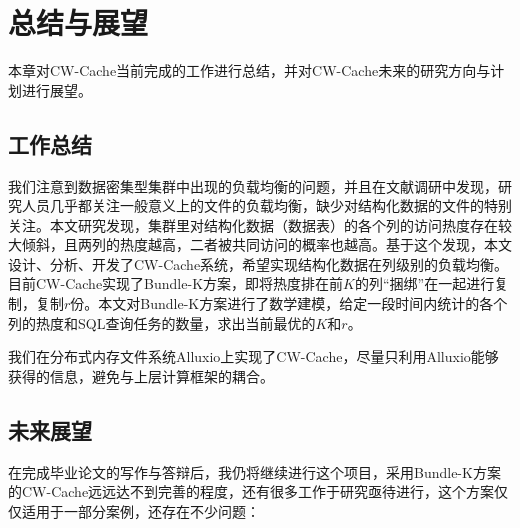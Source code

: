 \chapter{总结与展望}
\label{chp:future}

\par 本章对CW-Cache当前完成的工作进行总结，并对CW-Cache未来的研究方向与计划进行展望。

\section{工作总结}

\par 我们注意到数据密集型集群中出现的负载均衡的问题，并且在文献调研中发现，研究人员几乎都关注一般意义上的文件的负载均衡，缺少对结构化数据的文件的特别关注。本文研究发现，集群里对结构化数据（数据表）的各个列的访问热度存在较大倾斜，且两列的热度越高，二者被共同访问的概率也越高。基于这个发现，本文设计、分析、开发了CW-Cache系统，希望实现结构化数据在列级别的负载均衡。目前CW-Cache实现了Bundle-K方案，即将热度排在前$K$的列“捆绑”在一起进行复制，复制$r$份。本文对Bundle-K方案进行了数学建模，给定一段时间内统计的各个列的热度和SQL查询任务的数量，求出当前最优的$K$和$r$。

\par 我们在分布式内存文件系统Alluxio上实现了CW-Cache，尽量只利用Alluxio能够获得的信息，避免与上层计算框架的耦合。


\section{未来展望}

\par 在完成毕业论文的写作与答辩后，我仍将继续进行这个项目，采用Bundle-K方案的CW-Cache远远达不到完善的程度，还有很多工作于研究亟待进行，这个方案仅仅适用于一部分案例，还存在不少问题：

